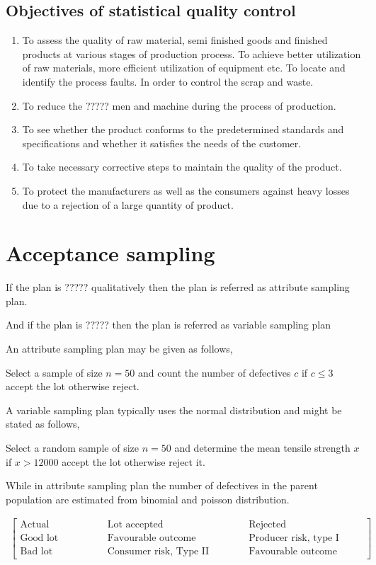 \documentclass[oneside,11pt,pdftex]{book}%
\numberwithin{equation}{section}
\numberwithin{section}{chapter}
\numberwithin{equation}{chapter}
\begin{document}
\section{Objectives of statistical quality control}
\begin{enumerate}
	\item To assess the quality of raw material, semi finished goods and finished products at various stages of production process. To achieve better utilization of raw materials, more efficient utilization of equipment etc. To locate and identify the process faults. In order to control the scrap and waste.
	\item  To reduce the ????? men and machine during the process of production.
	\item To see whether the product conforms to the predetermined standards and specifications and whether it satisfies the needs of the customer.
	\item To take necessary corrective steps to maintain the quality of the product.
	\item To protect the manufacturers as well as the consumers against heavy losses due to a rejection of a large quantity of product.
\end{enumerate}

\chapter{Acceptance sampling}
If the plan is ????? qualitatively then the plan is referred as attribute sampling plan.

And if the plan is ????? then the plan is referred as variable sampling plan

An attribute sampling plan may be given as follows,

Select a sample of size $ n=50 $ and count the number of defectives $ c $ if $ c \leq 3 $ accept the lot otherwise reject.

A variable sampling plan typically uses the normal distribution and might be stated as follows,

Select a random sample of size $ n =50$ and determine the mean tensile strength $ x $ if $ x>12000 $ accept the lot otherwise reject it.

While in attribute sampling plan the number of defectives in the parent population are estimated from binomial and poisson distribution.

\begin{align*}
	\begin{bmatrix}
		\text{Actual condition} && \text{Lot accepted} && \text{Rejected}\\
		\text{Good lot} && \text{Favourable outcome} && \text{Producer risk, type I error}\\
		\text{Bad lot} && \text{Consumer risk, Type II Error} && \text{Favourable outcome}
	\end{bmatrix}
\end{align*}
\end{document}
